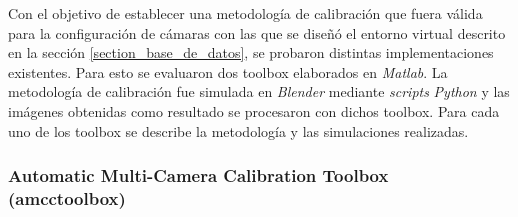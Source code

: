  
 
 
 Con el objetivo de establecer una metodología de calibración que fuera válida para la configuración de cámaras con las que se diseñó el entorno virtual descrito en la sección \ref{section_base_de_datos}, se probaron distintas implementaciones existentes. Para esto se evaluaron dos toolbox elaborados en \emph{Matlab}. La metodología de calibración fue simulada en \emph{Blender} mediante \textit{scripts} \emph{Python} y las imágenes obtenidas como resultado se procesaron con dichos toolbox. Para cada uno de los toolbox se describe la metodología y las simulaciones realizadas.
 
 
\subsubsection{Automatic Multi-Camera Calibration Toolbox (amcctoolbox) }\cite{amcctoolbox}  


